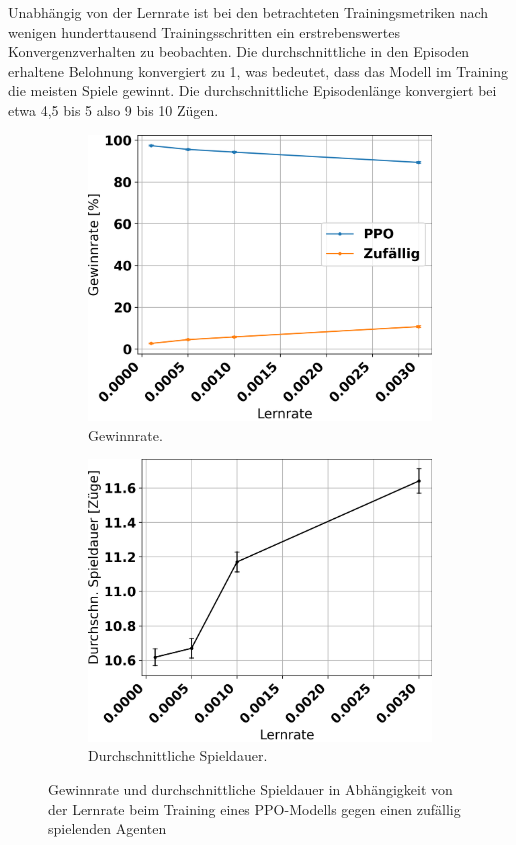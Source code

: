 Unabhängig von der Lernrate ist bei den betrachteten Trainingsmetriken nach wenigen hunderttausend Trainingsschritten ein erstrebenswertes Konvergenzverhalten zu beobachten. Die durchschnittliche in den Episoden erhaltene Belohnung konvergiert zu 1, was bedeutet, dass das Modell im Training die meisten Spiele gewinnt. Die durchschnittliche Episodenlänge konvergiert bei etwa 4,5 bis 5 also 9 bis 10 Zügen.

\begin{figure}[ht!]%
	\begin{subfigure}[b]{0.48\textwidth}
		\includegraphics[width=\textwidth]{Bilder/ppo_vs_random_win_rate_vs_learning_rate.png}
		\caption{Gewinnrate.}
		\label{fig:f21}
	\end{subfigure}
	\hfill
	\begin{subfigure}[b]{0.48\textwidth}
		\includegraphics[width=\textwidth]{Bilder/ppo_vs_random_game_length_vs_learning_rate.png}
		\caption{Durchschnittliche Spieldauer.}
		\label{fig:f22}
	\end{subfigure}
	\caption{Gewinnrate und durchschnittliche Spieldauer in Abhängigkeit von der Lernrate beim Training eines PPO-Modells gegen einen zufällig spielenden Agenten}
\end{figure}

